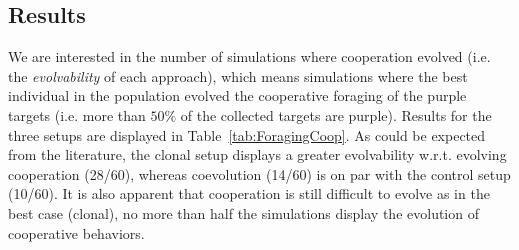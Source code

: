   \subsection{Results}

    \begin{table}[h]
      \caption{\textbf{Evolution of a cooperative strategy.}
      Number of simulations where the best individual evolved a cooperative strategy (collecting purple targets) or a solitary strategy (collecting green targets) for each setup in the foraging task.}
      \label{tab:ForagingCoop}
    \end{table}

    We are interested in the number of simulations where cooperation evolved (i.e. the \emph{evolvability} of each approach), which means simulations where the best individual in the population evolved the cooperative foraging of the purple targets (i.e. more than $50$\% of the collected targets are purple). Results for the three setups are displayed in Table~\ref{tab:ForagingCoop}. As could be expected from the literature, the clonal setup displays a greater evolvability w.r.t. evolving cooperation (28/60), whereas coevolution (14/60) is on par with the control setup (10/60). It is also apparent that cooperation is still difficult to evolve as in the best case (clonal), no more than half the simulations display the evolution of cooperative behaviors.

